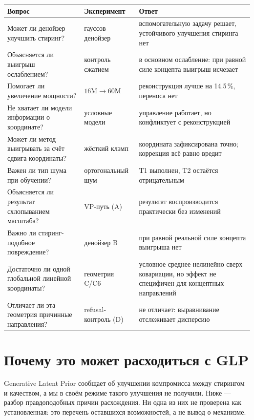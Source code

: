 \documentclass[10pt,a4paper]{article}
\begin{document}
\begin{center}\footnotesize
\begin{tabular}{@{}p{5.0cm}p{2.9cm}p{7.0cm}@{}}
\toprule
Вопрос & Эксперимент & Ответ\\
\midrule
Может ли денойзер улучшить стиринг? & гауссов денойзер & вспомогательную задачу решает, устойчивого улучшения стиринга нет\\
Объясняется ли выигрыш ослаблением? & контроль сжатием & в основном ослабление: при равной силе концепта выигрыш исчезает\\
Помогает ли увеличение мощности? & $16\text{M} \to 60\text{M}$ & реконструкция лучше на 14.5\,\%, переноса нет\\
Не хватает ли модели информации о координате? & условные модели & управление работает, но конфликтует с реконструкцией\\
Может ли метод выигрывать за счёт сдвига координаты? & жёсткий клэмп & координата зафиксирована точно; коррекция всё равно вредит\\
Важен ли тип шума при обучении? & ортогональный шум & T1 выполнен, T2 остаётся отрицательным\\
Объясняется ли результат схлопыванием масштаба? & VP-путь (A) & результат воспроизводится практически без изменений\\
Важно ли стиринг-подобное повреждение? & денойзер B & при равной реальной силе концепта выигрыша нет\\
Достаточно ли одной глобальной линейной координаты? & геометрия C/C6 & условное среднее нелинейно сверх ковариации, но эффект не специфичен для концептных направлений\\
Отличает ли эта геометрия причинные направления? & refusal-контроль (D) & не отличает: выравнивание отслеживает дисперсию\\
\bottomrule
\end{tabular}
\end{center}

\section{Почему это может расходиться с GLP}\label{sec:glpgap}

Generative Latent Prior \cite{luo2026glp} сообщает об улучшении компромисса
между стирингом и качеством, а мы в своём режиме такого улучшения не получили.
Ниже — разбор правдоподобных причин расхождения. Ни одна из них не проверена
как установленная: это перечень оставшихся возможностей, а не вывод о механизме.
\end{document}

